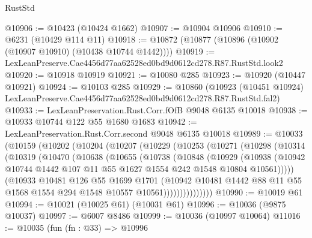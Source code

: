 \begin{lexlean}{RustStd}
\begin{coremodule}
{{@10906 := @10423 (@10424 @1662)
@10907 := @10904 @10906
@10910 := @6231 (@10429 @114 @11)
@10918 := @10872 (@10877 (@10896 (@10902 (@10907 @10910) (@10438 @10744 @1442))))
@10919 := LexLeanPreserve.Cae4456d77aa62528ed0bd9d0612cd278.R87.RustStd.look2
@10920 := @10918 @10919
@10921 := @10080 @285
@10923 := @10920 (@10447 @10921)
@10924 := @10103 @285
@10929 := @10860
    (@10923 (@10451 @10924) LexLeanPreserve.Cae4456d77aa62528ed0bd9d0612cd278.R87.RustStd.fal2)
@10933 := LexLeanPreservation.Rust.Corr.fOfB @9048 @6135 @10018
@10938 := @10933 @10744 @122 @55 @1680 @1683
@10942 := LexLeanPreservation.Rust.Corr.second @9048 @6135 @10018
@10989 := @10033
    (@10159
      (@10202
        (@10204
          (@10207
            (@10229
              (@10253
                (@10271
                  (@10298
                    (@10314
                      (@10319
                        (@10470
                          (@10638
                            (@10655
                              (@10738
                                (@10848
                                  (@10929
                                    (@10938
                                      (@10942
                                        @10744
                                        @1442
                                        @107
                                        @11
                                        @55
                                        @1627
                                        @1554
                                        @242
                                        @1548
                                        @10804
                                        @10561)))))
                              (@10933
                                @10481
                                @126
                                @55
                                @1699
                                @1701
                                (@10942
                                  @10481
                                  @1442
                                  @88
                                  @11
                                  @55
                                  @1568
                                  @1554
                                  @294
                                  @1548
                                  @10557
                                  @10561)))))))))))))))
@10990 := @10019 @61
@10994 := @10021 (@10025 @61) (@10031 @61)
@10996 := @10036 (@9875 @10037)
@10997 := @6007 @8486
@10999 := @10036 (@10997 @10064)
@11016 := @10035
    (fun (fn : @33) =>
    @10996
}}
\end{coremodule}
\end{lexlean}
